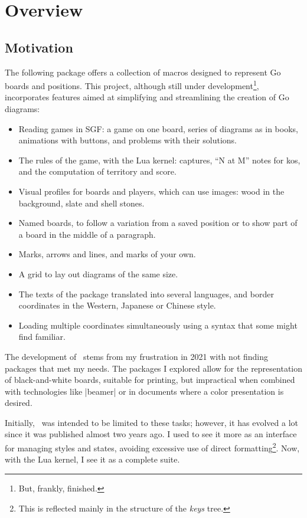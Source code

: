 \section{Overview}

\subsection{Motivation}

The following package offers a collection of macros designed to represent Go boards and positions. This project, although still under development\footnote{But, frankly, finished.}, incorporates features aimed at simplifying and streamlining the creation of Go diagrams:
\begin{itemize}
	\item Reading games in SGF: a game on one board, series of diagrams as in books, animations with buttons, and problems with their solutions.
	\item The rules of the game, with the Lua kernel: captures, ``N at M'' notes for kos, and the computation of territory and score.
	\item Visual profiles for boards and players, which can use images: wood in the background, slate and shell stones.
	\item Named boards, to follow a variation from a saved position or to show part of a board in the middle of a paragraph.
	\item Marks, arrows and lines, and marks of your own.
	\item A grid to lay out diagrams of the same size.
	\item The texts of the package translated into several languages, and border coordinates in the Western, Japanese or Chinese style.
	\item Loading multiple coordinates simultaneously using a syntax that some might find familiar.
\end{itemize}

The development of \pgfgoname\ stems from my frustration in 2021 with not finding packages that met my needs. The packages I explored allow for the representation of black-and-white boards, suitable for printing, but impractical when combined with technologies like |beamer| or in documents where a color presentation is desired.

Initially, \pgfgoname\ was intended to be limited to these tasks; however, it has evolved a lot since it was published almost two years ago. I used to see it more as an interface for managing styles and states, avoiding excessive use of direct formatting\footnote{This is reflected mainly in the structure of the \emph{keys} tree.}. Now, with the Lua kernel, I see it as a complete suite.

